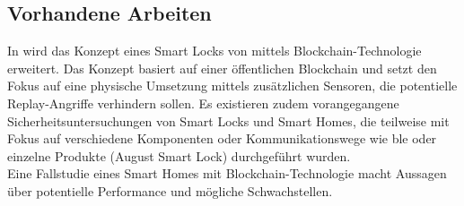     \newpage
    \subsection{Vorhandene Arbeiten}
    \label{sec:problem_relatedWork}
        In \cite{Han2017} wird das Konzept eines Smart Locks von \cite{Park2009} mittels Blockchain-Technologie erweitert.
        Das Konzept basiert auf einer öffentlichen Blockchain und setzt den Fokus auf eine physische Umsetzung mittels zusätzlichen Sensoren, die potentielle Replay-Angriffe verhindern sollen.
        \newpage
        \indent Es existieren zudem vorangegangene Sicherheitsuntersuchungen von Smart Locks \cite{Ho2016,Ye2017} und Smart Homes\cite{Fernandes2016}, die teilweise mit Fokus auf verschiedene Komponenten oder Kommunikationswege wie \gls{ble}\cite{Rose2016} oder einzelne Produkte (August Smart Lock\cite{Fuller2017}) durchgeführt wurden.
        \medskip\\
        Eine Fallstudie eines Smart Homes mit Blockchain-Technologie\cite{Dorri2017} macht Aussagen über potentielle Performance und mögliche Schwachstellen.
